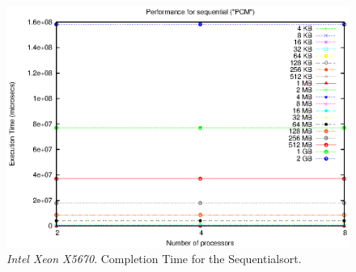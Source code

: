 \begin{figure}[t]
	\begin{center}
		\includegraphics[scale=0.6]{plots/test_00_PCM/NxTxM/sequential_PCM_NxTxM}
	\end{center}
  	\caption{\textit{Intel Xeon X5670}. Completion Time for the Sequentialsort.}
  	\label{sequential-PCM}
\end{figure}


